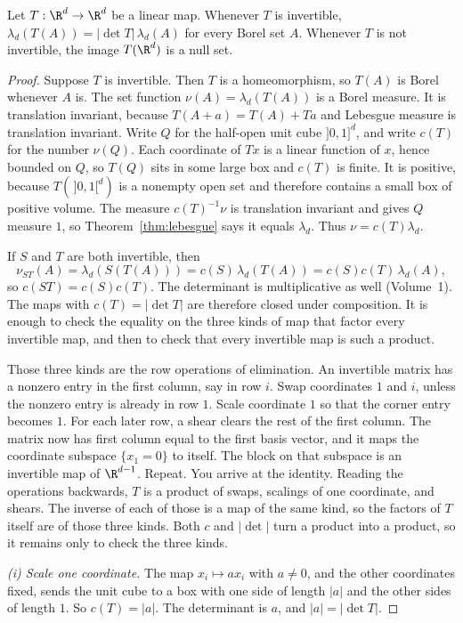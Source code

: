 \begin{theorem}\label{thm:lineardet}
Let $T:\R^d\to\R^d$ be a linear map. Whenever $T$ is invertible, $\lambda_d(T(A))=|\det T|\,\lambda_d(A)$ for every Borel set $A$. Whenever $T$ is not invertible, the image $T(\R^d)$ is a null set.
\end{theorem}
\begin{proof}
Suppose $T$ is invertible. Then $T$ is a homeomorphism, so $T(A)$ is Borel whenever $A$ is. The set function $\nu(A)=\lambda_d(T(A))$ is a Borel measure. It is translation invariant, because $T(A+a)=T(A)+Ta$ and Lebesgue measure is translation invariant. Write $Q$ for the half-open unit cube $]0,1]^d$, and write $c(T)$ for the number $\nu(Q)$. Each coordinate of $Tx$ is a linear function of $x$, hence bounded on $Q$, so $T(Q)$ sits in some large box and $c(T)$ is finite. It is positive, because $T(\,]0,1[^d)$ is a nonempty open set and therefore contains a small box of positive volume. The measure $c(T)^{-1}\nu$ is translation invariant and gives $Q$ measure $1$, so Theorem~\ref{thm:lebesgue} says it equals $\lambda_d$. Thus $\nu=c(T)\lambda_d$.

If $S$ and $T$ are both invertible, then
\[
\nu_{ST}(A)=\lambda_d(S(T(A)))=c(S)\,\lambda_d(T(A))=c(S)c(T)\,\lambda_d(A),
\]
so $c(ST)=c(S)c(T)$. The determinant is multiplicative as well (Volume~1). The maps with $c(T)=|\det T|$ are therefore closed under composition. It is enough to check the equality on the three kinds of map that factor every invertible map, and then to check that every invertible map is such a product.

Those three kinds are the row operations of elimination. An invertible matrix has a nonzero entry in the first column, say in row $i$. Swap coordinates $1$ and $i$, unless the nonzero entry is already in row $1$. Scale coordinate $1$ so that the corner entry becomes $1$. For each later row, a shear clears the rest of the first column. The matrix now has first column equal to the first basis vector, and it maps the coordinate subspace $\{x_1=0\}$ to itself. The block on that subspace is an invertible map of $\R^{d-1}$. Repeat. You arrive at the identity. Reading the operations backwards, $T$ is a product of swaps, scalings of one coordinate, and shears. The inverse of each of those is a map of the same kind, so the factors of $T$ itself are of those three kinds. Both $c$ and $|\det|$ turn a product into a product, so it remains only to check the three kinds.

\emph{(i) Scale one coordinate.} The map $x_i\mapsto a x_i$ with $a\ne 0$, and the other coordinates fixed, sends the unit cube to a box with one side of length $|a|$ and the other sides of length $1$. So $c(T)=|a|$. The determinant is $a$, and $|a|=|\det T|$.


\end{proof}

